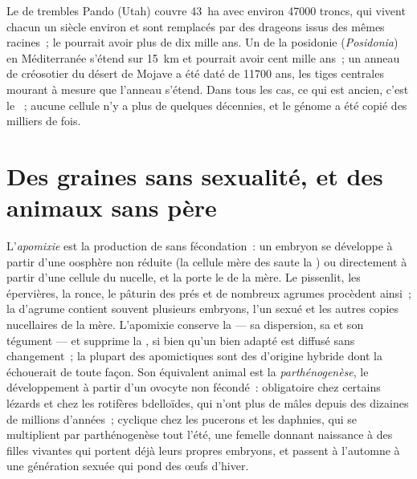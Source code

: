 \begin{example}\label{ex:b2:asexual-reproduction:oldest}
Le  de trembles Pando (Utah) couvre \qty{43}{ha} avec environ
\num{47000} troncs, qui vivent chacun un siècle environ et sont remplacés
par des drageons issus des mêmes racines~; le  pourrait avoir plus
de dix mille ans. Un  de la posidonie (\emph{Posidonia}) en
Méditerranée s'étend sur \qty{15}{km} et pourrait avoir cent mille ans~;
un anneau de créosotier du désert de Mojave a été daté de \num{11700}
ans, les tiges centrales mourant à mesure que l'anneau s'étend. Dans
tous les cas, ce qui est ancien, c'est le ~; aucune cellule n'y a
plus de quelques décennies, et le génome a été copié des milliers de
fois.
\end{example}

\section{Des graines sans sexualité, et des animaux sans père}

\begin{definition}[Apomixie]\label{def:b2:asexual-reproduction:apomixis}
L'\emph{apomixie} est la production de  sans fécondation~: un
embryon se développe à partir d'une oosphère non réduite (la cellule
mère des  saute la ) ou directement à partir d'une
cellule du nucelle, et la  porte le  de la mère. Le
pissenlit, les épervières, la ronce, le pâturin des prés et de nombreux
agrumes procèdent ainsi~; la  d'agrume contient souvent plusieurs
embryons, l'un sexué et les autres copies nucellaires de la mère.
L'apomixie conserve la  --- sa dispersion, sa  et son
tégument --- et supprime la , si bien qu'un  bien adapté
est diffusé sans changement~; la plupart des apomictiques sont des
 d'origine hybride dont la  échouerait de toute façon.
Son équivalent animal est la \emph{parthénogenèse}, le développement à
partir d'un ovocyte non fécondé~: obligatoire chez certains lézards et
chez les rotifères bdelloïdes, qui n'ont plus de mâles depuis des
dizaines de millions d'années~; cyclique chez les pucerons et les
daphnies, qui se multiplient par parthénogenèse tout l'été, une femelle
donnant naissance à des filles vivantes qui portent déjà leurs propres
embryons, et passent à l'automne à une génération sexuée qui pond des
œufs d'hiver.
\end{definition}

